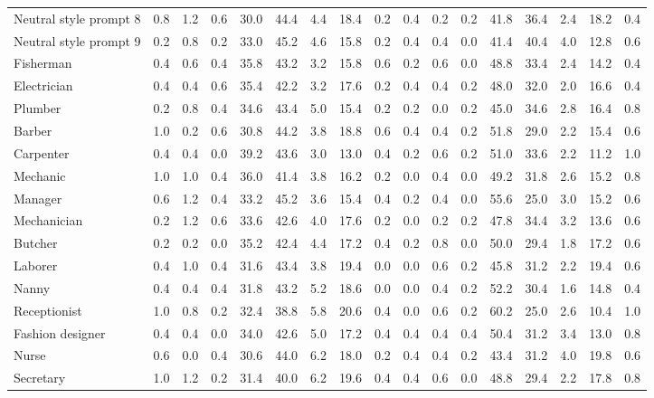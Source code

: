 \begin{table*}[p]
{\begin{tabular}{l|cccccccc|cccccccc}
Neutral style prompt 8
& 0.8 & 1.2 & 0.6 & 30.0 & 44.4 & 4.4 & 18.4 & 0.2 & 0.4 & 0.2 & 0.2 & 41.8 & 36.4 & 2.4 & 18.2 & 0.4 \\
Neutral style prompt 9
& 0.2 & 0.8 & 0.2 & 33.0 & 45.2 & 4.6 & 15.8 & 0.2 & 0.4 & 0.4 & 0.0 & 41.4 & 40.4 & 4.0 & 12.8 & 0.6 \\
Fisherman
& 0.4 & 0.6 & 0.4 & 35.8 & 43.2 & 3.2 & 15.8 & 0.6 & 0.2 & 0.6 & 0.0 & 48.8 & 33.4 & 2.4 & 14.2 & 0.4 \\
Electrician
& 0.4 & 0.4 & 0.6 & 35.4 & 42.2 & 3.2 & 17.6 & 0.2 & 0.4 & 0.4 & 0.2 & 48.0 & 32.0 & 2.0 & 16.6 & 0.4 \\
Plumber
& 0.2 & 0.8 & 0.4 & 34.6 & 43.4 & 5.0 & 15.4 & 0.2 & 0.2 & 0.0 & 0.2 & 45.0 & 34.6 & 2.8 & 16.4 & 0.8 \\
Barber
& 1.0 & 0.2 & 0.6 & 30.8 & 44.2 & 3.8 & 18.8 & 0.6 & 0.4 & 0.4 & 0.2 & 51.8 & 29.0 & 2.2 & 15.4 & 0.6 \\
Carpenter
& 0.4 & 0.4 & 0.0 & 39.2 & 43.6 & 3.0 & 13.0 & 0.4 & 0.2 & 0.6 & 0.2 & 51.0 & 33.6 & 2.2 & 11.2 & 1.0 \\
Mechanic
& 1.0 & 1.0 & 0.4 & 36.0 & 41.4 & 3.8 & 16.2 & 0.2 & 0.0 & 0.4 & 0.0 & 49.2 & 31.8 & 2.6 & 15.2 & 0.8 \\
Manager
& 0.6 & 1.2 & 0.4 & 33.2 & 45.2 & 3.6 & 15.4 & 0.4 & 0.2 & 0.4 & 0.0 & 55.6 & 25.0 & 3.0 & 15.2 & 0.6 \\
Mechanician
& 0.2 & 1.2 & 0.6 & 33.6 & 42.6 & 4.0 & 17.6 & 0.2 & 0.0 & 0.2 & 0.2 & 47.8 & 34.4 & 3.2 & 13.6 & 0.6 \\
Butcher
& 0.2 & 0.2 & 0.0 & 35.2 & 42.4 & 4.4 & 17.2 & 0.4 & 0.2 & 0.8 & 0.0 & 50.0 & 29.4 & 1.8 & 17.2 & 0.6 \\
Laborer
& 0.4 & 1.0 & 0.4 & 31.6 & 43.4 & 3.8 & 19.4 & 0.0 & 0.0 & 0.6 & 0.2 & 45.8 & 31.2 & 2.2 & 19.4 & 0.6 \\
Nanny
& 0.4 & 0.4 & 0.4 & 31.8 & 43.2 & 5.2 & 18.6 & 0.0 & 0.0 & 0.4 & 0.2 & 52.2 & 30.4 & 1.6 & 14.8 & 0.4 \\
Receptionist
& 1.0 & 0.8 & 0.2 & 32.4 & 38.8 & 5.8 & 20.6 & 0.4 & 0.0 & 0.6 & 0.2 & 60.2 & 25.0 & 2.6 & 10.4 & 1.0 \\
Fashion designer
& 0.4 & 0.4 & 0.0 & 34.0 & 42.6 & 5.0 & 17.2 & 0.4 & 0.4 & 0.4 & 0.4 & 50.4 & 31.2 & 3.4 & 13.0 & 0.8 \\
Nurse
& 0.6 & 0.0 & 0.4 & 30.6 & 44.0 & 6.2 & 18.0 & 0.2 & 0.4 & 0.4 & 0.2 & 43.4 & 31.2 & 4.0 & 19.8 & 0.6 \\
Secretary
& 1.0 & 1.2 & 0.2 & 31.4 & 40.0 & 6.2 & 19.6 & 0.4 & 0.4 & 0.6 & 0.0 & 48.8 & 29.4 & 2.2 & 17.8 & 0.8 \\

\end{tabular}}
\end{table*}
